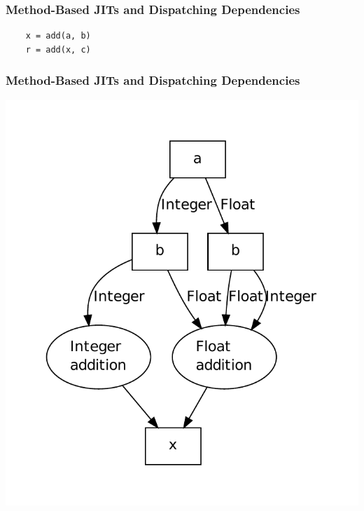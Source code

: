 \documentclass[utf8x]{beamer}
\begin{document}
\begin{frame}[containsverbatim]
  \frametitle{Method-Based JITs and Dispatching Dependencies}
\begin{verbatim}
    x = add(a, b)
    r = add(x, c)
\end{verbatim}
\end{frame}

\begin{frame}
  \frametitle{Method-Based JITs and Dispatching Dependencies}
  \includegraphics[scale=0.5]{figures/add1.pdf}
%
%
\end{frame}
\end{document}
